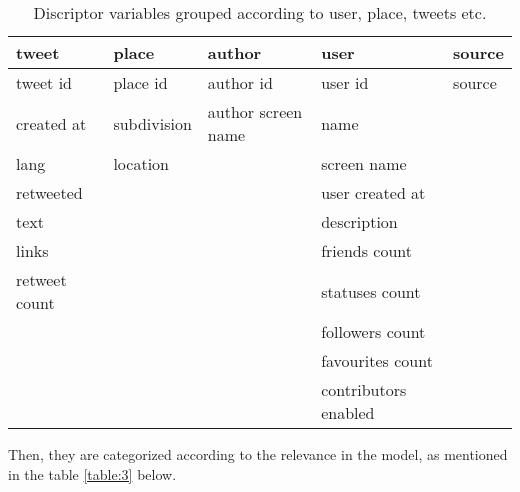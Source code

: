 \documentclass[a4paper,12pt, notitlepage]{article}
\begin{document}
\begin{table}[!htbp]
\centering
\begin{tabular}{ |l|l|l|l|l| } 
\hline \rowcolor{Gray}
tweet & place & author & user & source \\[1ex]
\hline
tweet id      & place id    & author id          & user id             & source \\[1ex]
created at    & subdivision & author screen name & name                &        \\[1ex]
lang          & location    &                    & screen name         &        \\[1ex]
retweeted     &             &                    & user created at     &        \\[1ex]
text          &             &                    & description         &        \\[1ex]
links         &             &                    & friends count       &        \\[1ex]
retweet count &             &                    & statuses count      &        \\[1ex]
              &             &                    & followers count     &        \\[1ex]
              &             &                    & favourites count    &        \\[1ex]
              &             &                    & contributors enabled&        \\[1ex]
\hline
\end{tabular}
\caption{Discriptor variables grouped according to user, place, tweets etc.}
\label{table:2}
\end{table}

\par
Then, they are categorized according to the relevance in the model, as mentioned in the table \ref{table:3} below.
\end{document}
